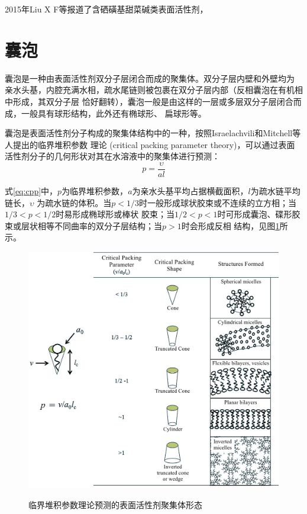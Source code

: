 \documentclass[bachelor,fandolfonts,replaceperiod]{jnuthesis}
\begin{document}
    2015年Liu X F等\cite{zhang2015}报道了含硒磺基甜菜碱类表面活性剂，
    
    \section{囊泡}
    囊泡是一种由表面活性剂双分子层闭合而成的聚集体。双分子层内壁和外壁均为
    亲水头基，内腔充满水相，疏水尾链则被包裹在双分子层内部（反相囊泡在有机相中形成，其双分子层
    恰好翻转），囊泡一般是由这样的一层或多层双分子层闭合而成，一般具有球形结构，此外还有椭球形、
    扁球形等。
    
    囊泡是表面活性剂分子构成的聚集体结构中的一种，按照Israelachvili和Mitchell等人提出的临界堆积参数
    理论 (critical packing parameter theory)，可以通过表面活性剂分子的几何形状对其在水溶液中的聚集体进行预测：
    \begin{equation}\label{eq:cpp}
        p=\frac{\upsilon}{al}
    \end{equation}
    
    式\ref{eq:cpp}中，$p$为临界堆积参数，$a$为亲水头基平均占据横截面积，$l$为疏水链平均链长，$\upsilon$
    为疏水链的体积。当$p<1/3$时一般形成球状胶束或不连续的立方相；当$1/3<p<1/2$时易形成椭球形或棒状
    胶束；当$1/2<p<1$时可形成囊泡、碟形胶束或层状相等不同曲率的双分子层结构；当$p>1$时会形成反相
    结构，见图\ref{fig:scheme-cpp}所示。
    \begin{figure}[htbp]
        \centering
        \includegraphics[width= .826\textwidth]{figure/scheme-cpp.png}\\
        \caption{临界堆积参数理论预测的表面活性剂聚集体形态\cite{salim2014}}\label{fig:scheme-cpp}
    \end{figure}
\end{document}

